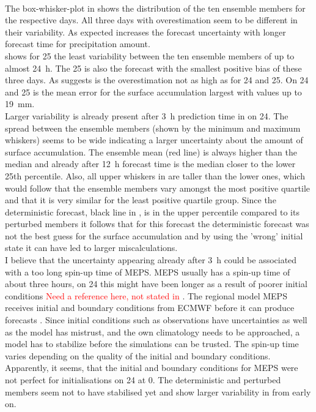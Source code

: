 \\
The box-whisker-plot in  shows the distribution of the ten ensemble members for the respective days. All three days with overestimation seem to be different in their variability. As expected increases the forecast uncertainty with longer forecast time for precipitation amount.  
\\
 shows for \SI{25}{\dec} the least variability between the ten ensemble members of up to almost \SI{24}{\hour}. The \SI{25}{\dec} is also the forecast with the smallest positive bias of these three days. As  suggests is the overestimation not as high as for \num{24} and \SI{25}{\dec}. On \num{24} and \SI{25}{\dec} is the mean error for the surface accumulation largest with values up to \SI{19}{\mm}. 
\\
Larger variability is already present after \SI{3}{\hour} prediction time in  on \SI{24}{\dec}. The spread between the ensemble members (shown by the minimum and maximum whiskers) seems to be wide indicating a larger uncertainty about the amount of surface accumulation. The ensemble mean (red line) is always higher than the median and already after \SI{12}{\hour} forecast time is the median closer to the lower 25th percentile. Also, all upper whiskers in  are taller than the lower ones, which would follow that the ensemble members vary amongst the most positive quartile and that it is very similar for the least positive quartile group. Since the deterministic forecast, black line in , is in the upper percentile compared to its perturbed members it follows that for this forecast the deterministic forecast was not the best guess for the surface accumulation and by using the 'wrong' initial state it can have led to larger miscalculations. 
\\
I believe that the uncertainty appearing already after \SI{3}{\hour} could be associated with a too long spin-up time of MEPS. MEPS usually has a spin-up time of about three hours, on \SI{24}{\dec} this might have been longer as a result of poorer initial conditions \textcolor{red}{Need a reference here, not stated in \citet{muller_arome-metcoop:_2017}}. The regional model MEPS receives initial and boundary conditions from ECMWF before it can produce forecasts \citep{muller_arome-metcoop:_2017}. Since initial conditions such as observations have uncertainties as well as the model has mistrust, and  the own climatology needs to be approached, a model has to stabilize before the simulations can be trusted. The spin-up time varies depending on the quality of the initial and boundary conditions. Apparently, it seems, that the initial and boundary conditions for MEPS were not perfect for initialisations on \SI{24}{\dec} at \SI{0}{\UTC}. The deterministic and perturbed members seem not to have stabilised yet and show larger variability in  from early on.
